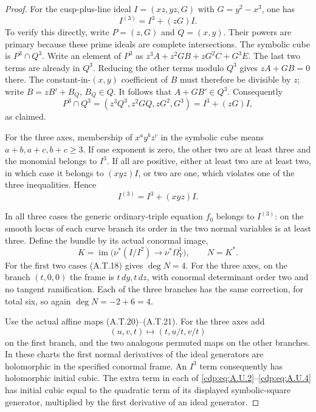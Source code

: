\begin{proof}
For the cusp-plus-line ideal $I=(xz,yz,G)$ with
$G=y^2-x^3$, one has
\[
                   I^{(3)}=I^3+(zG)I.             \tag{A.U.3}\label{cdp:eq:A.U.3}
\]
To verify this directly, write $P=(z,G)$ and
$Q=(x,y)$. Their powers are primary because these
prime ideals are complete intersections. The
symbolic cube is $P^3\cap Q^3$.
Write an element of $P^3$ as
$z^3A+z^2GB+zG^2C+G^3E$.
The last two terms are already in $Q^3$.
Reducing the other terms modulo $Q^3$ gives
$zA+GB=0$ there. The constant-in-$(x,y)$ coefficient
of $B$ must therefore be divisible by $z$; write
$B=zB'+B_Q$, $B_Q\in Q$.
It follows that $A+GB'\in Q^3$.
Consequently
\[
 P^3\cap Q^3=(z^3Q^3,z^2GQ,zG^2,G^3)
                        =I^3+(zG)I,
\]
as claimed.

For the three axes, membership of
$x^a y^b z^c$ in the symbolic cube means
$a+b,a+c,b+c\ge3$.
If one exponent is zero, the other two are at
least three and the monomial belongs to $I^3$.
If all are positive, either at least two are at
least two, in which case it belongs to $(xyz)I$,
or two are one, which violates one of the three
inequalities. Hence
\[
                         I^{(3)}=I^3+(xyz)I.       \tag{A.U.4}\label{cdp:eq:A.U.4}
\]

In all three cases the generic ordinary-triple
equation $f_0$ belongs to $I^{(3)}$: on the smooth
locus of each curve branch its order in the two
normal variables is at least three. Define the
bundle by its actual conormal image,
\[
 K=\operatorname{im}\bigl(\nu^*(I/I^2)
                           \to\nu^*\Omega_Y^1\bigr),
 \qquad N=K^*.
\]
For the first two cases (A.T.18) gives $\deg N=4$.
For the three axes, on the branch $(t,0,0)$ the
frame is $t\,dy,t\,dz$, with conormal determinant
order two and no tangent ramification. Each of the
three branches has the same correction, for total
six, so again $\deg N=-2+6=4$.

Use the actual affine maps (A.T.20)--(A.T.21).
For the three axes add
\[
              (u,v,t)\longmapsto(t,u/t,v/t)
                                                        \tag{A.U.5}\label{cdp:eq:A.U.5}
\]
on the first branch, and the two analogous permuted
maps on the other branches. In these charts the
first normal derivatives of the ideal generators
are holomorphic in the specified conormal frame.
An $I^3$ term consequently has holomorphic initial
cubic. The extra term in each of \eqref{cdp:eq:A.U.2}--\eqref{cdp:eq:A.U.4}
has initial cubic equal to the quadratic term of
its displayed symbolic-square generator, multiplied
by the first derivative of an ideal generator.


\end{proof}
